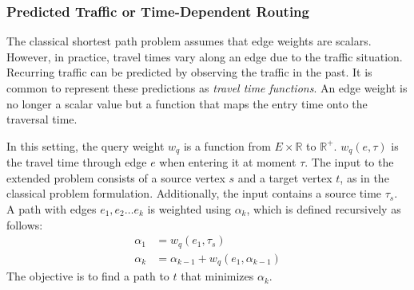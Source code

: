 \documentclass[manuscript,review]{acmart}
\begin{document}

\subsubsection{Predicted Traffic or Time-Dependent Routing}
\label{sec:predicted-traffic}

The classical shortest path problem assumes that edge weights are scalars.
However, in practice, travel times vary along an edge due to the traffic situation.
Recurring traffic can be predicted by observing the traffic in the past.
It is common \cite{bgsv-mtdtt-13,bdpw-dtdrp-16,swz-sfert-21} to represent these predictions as \emph{travel time functions}.
An edge weight is no longer a scalar value but a function that maps the entry time onto the traversal time.

In this setting, the query weight $w_q$ is a function from $E\times \mathbb{R}$ to $\mathbb{R}^+$.
$w_q(e, \tau)$ is the travel time through edge $e$ when entering it at moment $\tau$.
The input to the extended problem consists of a source vertex $s$ and a target vertex $t$, as in the classical problem formulation.
Additionally, the input contains a source time $\tau_s$.
A path with edges $e_1,e_2\ldots e_k$ is weighted using $\alpha_k$, which is defined recursively as follows:\[
\begin{split}
\alpha_{1} & = w_q(e_1, \tau_s) \\
\alpha_{k} & = \alpha_{k-1} + w_q(e_1, \alpha_{k-1})
\end{split}
\]
The objective is to find a path to $t$ that minimizes $\alpha_k$.
\end{document}

